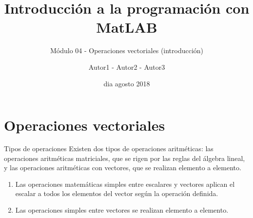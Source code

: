 \documentclass{bredelebeamer}
\title[Programación en MatLAB]{Introducción a la programación con MatLAB}
\subtitle{Módulo 04 - Operaciones vectoriales (introducción)}
\author{Autor1 - Autor2 - Autor3\inst{1}}
\institute[UTN.BA]
{
  \inst{1}%
  Universidad Tecnológica Nacional\\
  Facultad Regional Buenos Aires
  }
\date{dia agosto 2018}
\begin{document}
\begin{frame}
  \titlepage 
\end{frame}




\section{Operaciones vectoriales}

\begin{frame}{Tipos de operaciones}
Existen dos tipos de operaciones aritméticas: las operaciones aritméticas matriciales, que se rigen por las reglas del álgebra lineal, y las operaciones aritméticas con vectores, que se realizan elemento a elemento.\\
\begin{enumerate}
\item Las operaciones matemáticas simples entre escalares y vectores aplican el escalar a todos los elementos del vector según la operación definida.
\item Las operaciones simples entre vectores se realizan elemento a elemento.
\end{enumerate}
\end{frame}
\end{document}
